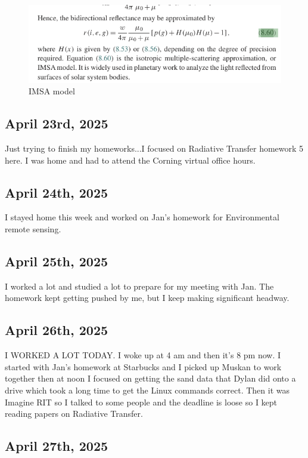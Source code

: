 \documentclass{article}
\begin{document}
\begin{figure}[h!]
\centering
\includegraphics[scale=.6]{IMSAmodel.png}
\caption{IMSA model}
\label{fig:Imsa model}
\end{figure}

\subsection{April 23rd, 2025}
Just trying to finish my homeworks...I focused on Radiative Transfer homework 5 here. I was home and had to attend the Corning virtual office hours. 




\subsection{April 24th, 2025}
I stayed home this week and worked on Jan's homework for Environmental remote sensing. 



\subsection{April 25th, 2025}
I worked a lot and studied a lot to prepare for my meeting with Jan. The homework kept getting pushed by me, but I keep making significant headway. 



\subsection{April 26th, 2025}
I WORKED A LOT TODAY. I woke up at 4 am and then it's 8 pm now. 
I started with Jan's homework at Starbucks and I picked up Muskan to work together then at noon I focused on getting the sand data that Dylan did onto a drive which took a long time to get the Linux commands correct. Then it was Imagine RIT so I talked to some people and the deadline is loose so I kept reading papers on Radiative Transfer. 



\subsection{April 27th, 2025}
\end{document}
